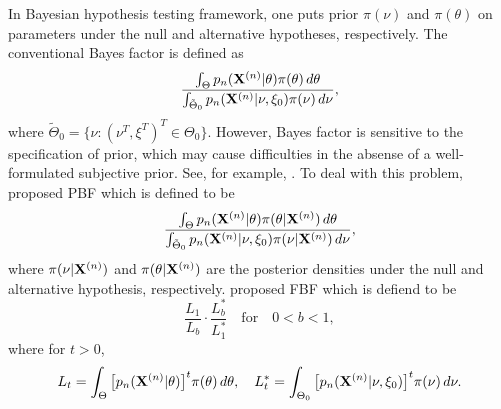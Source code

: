 \documentclass[11pt]{article}
\theoremstyle{plain}
\theoremstyle{definition}
\theoremstyle{remark}
\begin{document}
In Bayesian hypothesis testing framework, one puts prior $\pi(\nu)$ and $\pi(\theta)$ on parameters under the null and alternative hypotheses, respectively.
The conventional Bayes factor is defined as
\begin{equation*}
  \frac{\int_{\Theta} p_n(\mathbf{X}^{(n)}|\theta)\pi(\theta)\, d\theta}
    {\int_{\tilde{\Theta}_0}p_n(\mathbf{X}^{(n)}|\nu,\xi_0)\pi(\nu)\, d\nu},
\end{equation*}
where $\tilde{\Theta}_0=\{\nu: (\nu^T,\xi^T)^T\in \Theta_0\}$.
However, Bayes factor is sensitive to the specification of prior, which may cause difficulties in the absense of a well-formulated subjective prior. See, for example, \cite{Lindley1982}.
To deal with this problem,~\cite{Aitkin1991Posterior} proposed PBF which is defined to be
\begin{equation*}
    \frac{\int_{\Theta} p_n(\mathbf{X}^{(n)}|\theta)\pi(\theta|\mathbf{X}^{(n)})\, d\theta}{\int_{\tilde{\Theta}_0}p_n(\mathbf{X}^{(n)}|\nu,\xi_0)\pi(\nu|\mathbf{X}^{(n)})\, d\nu},
\end{equation*}
where $\pi(\nu|\mathbf{X}^{(n)})$ and $\pi(\theta|\mathbf{X}^{(n)})$ are the posterior densities under the null and alternative hypothesis, respectively.
\cite{Fractional1995} proposed  FBF which is defiend to be
\begin{equation*}
    \frac{L_{1}}{L_{b}}\cdot \frac{L_{b}^*}{L_{1}^*}\quad \text{for}\quad 0<b<1,
\end{equation*}
where for $t>0$,
 $$
 L_t=\int_{\Theta}\big[p_n(\mathbf{X}^{(n)}|\theta)\big]^t \pi(\theta)\, d\theta,\quad
 L_t^*=\int_{\Theta_0}\big[p_n(\mathbf{X}^{(n)}|\nu,\xi_0)\big]^t \pi(\nu)\, d\nu.
 $$
\end{document}

